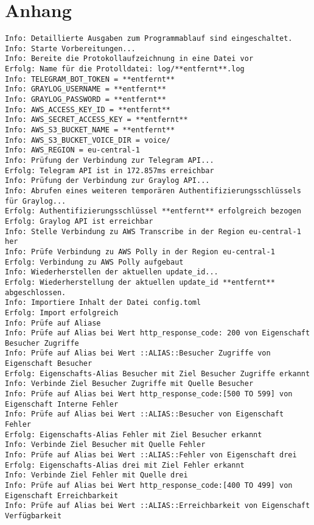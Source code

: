 \appendix
\chapter{Anhang}
\label{cha:anhang}

\begin{lstlisting}[caption={Konsolenausgabe beim Start des Programms}, label=log-start, xleftmargin=6mm]
Info: Detaillierte Ausgaben zum Programmablauf sind eingeschaltet. 
Info: Starte Vorbereitungen... 
Info: Bereite die Protokollaufzeichnung in eine Datei vor 
Erfolg: Name für die Protolldatei: log/**entfernt**.log 
Info: TELEGRAM_BOT_TOKEN = **entfernt** 
Info: GRAYLOG_USERNAME = **entfernt**
Info: GRAYLOG_PASSWORD = **entfernt**
Info: AWS_ACCESS_KEY_ID = **entfernt**
Info: AWS_SECRET_ACCESS_KEY = **entfernt**
Info: AWS_S3_BUCKET_NAME = **entfernt**
Info: AWS_S3_BUCKET_VOICE_DIR = voice/ 
Info: AWS_REGION = eu-central-1 
Info: Prüfung der Verbindung zur Telegram API... 
Erfolg: Telegram API ist in 172.857ms erreichbar 
Info: Prüfung der Verbindung zur Graylog API... 
Info: Abrufen eines weiteren temporären Authentifizierungsschlüssels für Graylog... 
Erfolg: Authentifizierungsschlüssel **entfernt** erfolgreich bezogen 
Erfolg: Graylog API ist erreichbar 
Info: Stelle Verbindung zu AWS Transcribe in der Region eu-central-1 her 
Info: Prüfe Verbindung zu AWS Polly in der Region eu-central-1 
Erfolg: Verbindung zu AWS Polly aufgebaut 
Info: Wiederherstellen der aktuellen update_id... 
Erfolg: Wiederherstellung der aktuellen update_id **entfernt** abgeschlossen. 
Info: Importiere Inhalt der Datei config.toml 
Erfolg: Import erfolgreich 
Info: Prüfe auf Aliase 
Info: Prüfe auf Alias bei Wert http_response_code: 200 von Eigenschaft Besucher Zugriffe 
Info: Prüfe auf Alias bei Wert ::ALIAS::Besucher Zugriffe von Eigenschaft Besucher 
Erfolg: Eigenschafts-Alias Besucher mit Ziel Besucher Zugriffe erkannt 
Info: Verbinde Ziel Besucher Zugriffe mit Quelle Besucher 
Info: Prüfe auf Alias bei Wert http_response_code:[500 TO 599] von Eigenschaft Interne Fehler 
Info: Prüfe auf Alias bei Wert ::ALIAS::Besucher von Eigenschaft Fehler 
Erfolg: Eigenschafts-Alias Fehler mit Ziel Besucher erkannt 
Info: Verbinde Ziel Besucher mit Quelle Fehler 
Info: Prüfe auf Alias bei Wert ::ALIAS::Fehler von Eigenschaft drei 
Erfolg: Eigenschafts-Alias drei mit Ziel Fehler erkannt 
Info: Verbinde Ziel Fehler mit Quelle drei 
Info: Prüfe auf Alias bei Wert http_response_code:[400 TO 499] von Eigenschaft Erreichbarkeit 
Info: Prüfe auf Alias bei Wert ::ALIAS::Erreichbarkeit von Eigenschaft Verfügbarkeit 

\end{lstlisting}
